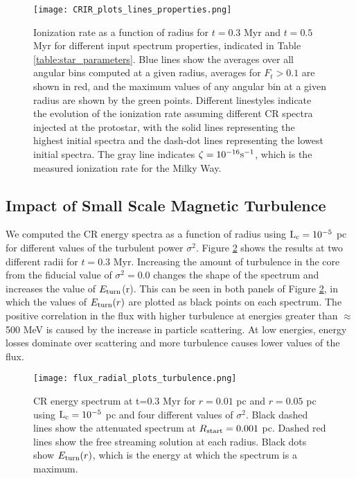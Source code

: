 \documentclass[twocolumn]{aastex63}
\begin{document}
\begin{figure*}
\centering
\texttt{[image: CRIR\_plots\_lines\_properties.png]}
\caption{Ionization rate as a function of radius for $t=0.3$ Myr and $t=0.5$ Myr for different input spectrum properties, indicated in Table \ref{table:star_parameters}. Blue lines show the averages over all angular bins computed at a given radius, averages for $F_t>0.1$ are shown in red, and the maximum values of any angular bin at a given radius are shown by the green points. Different linestyles indicate the evolution of the ionization rate assuming different CR spectra injected at the protostar, with the solid lines representing the highest initial spectra and the dash-dot lines representing the lowest initial spectra. The gray line indicates $\zeta=10^{-16} \rm s^{-1}$, which is the measured ionization rate for the Milky Way.}
\label{fig:crir_properties}
\end{figure*}

\subsection{Impact of Small Scale Magnetic Turbulence}
\label{subsection:turbulence}

We computed the CR energy spectra as a function of radius using $\rm L_c=10^{-5}$ pc for different values of the turbulent power $\sigma^2$. Figure \ref{fig:flux_radial_turbulence} shows the results at two different radii for $t=0.3$ Myr. Increasing the amount of turbulence in the core from the fiducial value of $\sigma^2=0.0$ changes the shape of the spectrum and increases the value of $E_{\rm turn}$(r). This can be seen in both panels of Figure \ref{fig:flux_radial_turbulence}, in which the values of $E_{\rm turn}(r)$ are plotted as black points on each spectrum. The positive correlation in the flux with higher turbulence at energies greater than $\approx$ 500 MeV is caused by the increase in particle scattering. At low energies, energy losses dominate over scattering and more turbulence causes lower values of the flux. 

\begin{figure*}
\centering
\texttt{[image: flux\_radial\_plots\_turbulence.png]}
\caption{CR energy spectrum at t=0.3 Myr for $r=0.01$ pc and $r=0.05$ pc using $\rm L_c=10^{-5}$ pc and four different values of $\sigma^2$. Black dashed lines show the attenuated spectrum at $R_{\rm start}=0.001$ pc. Dashed red lines show the free streaming solution at each radius. Black dots show $E_{\rm turn} (r)$, which is the energy at which the spectrum is a maximum.}
\label{fig:flux_radial_turbulence}
\end{figure*}
\end{document}
